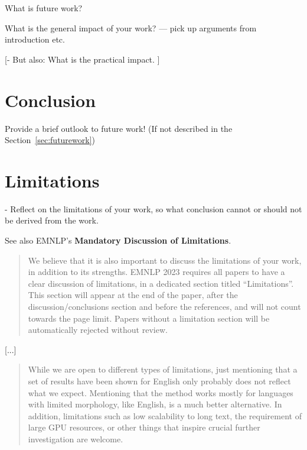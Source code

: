 \documentclass[sigconf, review, nonacm]{acmart}
\begin{document}
What is future work?

What is the general impact of your work?
--- pick up arguments from introduction etc.

[- But also: What is the practical impact. ]



\section{Conclusion}
\label{sec:conclusion}


Provide a brief outlook to future work! (If not described in the Section~\ref{sec:futurework})


\section*{Limitations}

- Reflect on the limitations of your work, so what conclusion cannot or should not be derived from the work.

See also EMNLP's \textbf{Mandatory Discussion of Limitations}.

\begin{quote}
    We believe that it is also important to discuss the limitations of your work, in addition to its strengths. EMNLP 2023 requires all papers to have a clear discussion of limitations, in a dedicated section titled “Limitations”. This section will appear at the end of the paper, after the discussion/conclusions section and before the references, and will not count towards the page limit. Papers without a limitation section will be automatically rejected without review.
\end{quote}

[...]

\begin{quote}
While we are open to different types of limitations, just mentioning that a set of results have been shown for English only probably does not reflect what we expect. Mentioning that the method works mostly for languages with limited morphology, like English, is a much better alternative. In addition, limitations such as low scalability to long text, the requirement of large GPU resources, or other things that inspire crucial further investigation are welcome.
\end{quote}
\end{document}
